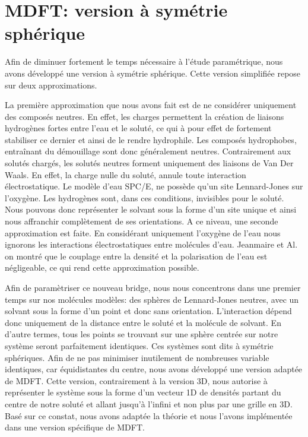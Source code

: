 \section{MDFT: version à symétrie sphérique}
Afin de diminuer fortement le temps nécessaire à l'étude paramétrique, nous avons développé une version à symétrie sphérique. Cette version simplifiée repose sur deux approximations. 

La première approximation que nous avons fait est de ne considérer uniquement des composés neutres. En effet, les charges permettent la création de liaisons hydrogènes fortes entre l'eau et le soluté, ce qui à pour effet de fortement stabiliser ce dernier et ainsi de le rendre hydrophile. Les composés hydrophobes, entraînant du démouillage sont donc généralement neutres.
Contrairement aux solutés chargés, les solutés neutres forment uniquement des liaisons de Van Der Waals. En effet, la charge nulle du soluté, annule toute interaction électrostatique. Le modèle d'eau SPC/E, ne possède qu'un site Lennard-Jones sur l'oxygène. Les hydrogènes sont, dans ces conditions, invisibles pour le soluté. Nous pouvons donc représenter le solvant sous la forme d'un site unique et ainsi nous affranchir complètement de ses orientations. A ce niveau, une seconde approximation est faite. En considérant uniquement l'oxygène de l'eau nous ignorons les interactions électrostatiques entre molécules d'eau. Jeanmaire et Al.\cite{jeanmairet_molecular_2013-1} on montré que le couplage entre la densité et la polarisation de l'eau est négligeable, ce qui rend cette approximation possible.

Afin de paramètriser ce nouveau bridge, nous nous concentrons dans une premier temps sur nos molécules modèles: des sphères de Lennard-Jones neutres, avec un solvant sous la forme d'un point et donc sans orientation. L’interaction dépend donc uniquement de la distance entre le soluté et la molécule de solvant. En d'autre termes, tous les points se trouvant sur une sphère centrée sur notre système seront parfaitement identiques. Ces systèmes sont dits à symétrie sphériques. Afin de ne pas minimiser inutilement de nombreuses variable identiques, car équidistantes du centre, nous avons développé une version adaptée de MDFT. Cette version, contrairement à la version 3D, nous autorise à représenter le système sous la forme d'un vecteur 1D de densités partant du centre de notre soluté et allant jusqu'à l'infini et non plus par une grille en 3D. Basé sur ce constat, nous avons adaptée la théorie et nous l'avons implémentée dans une version spécifique de MDFT.



